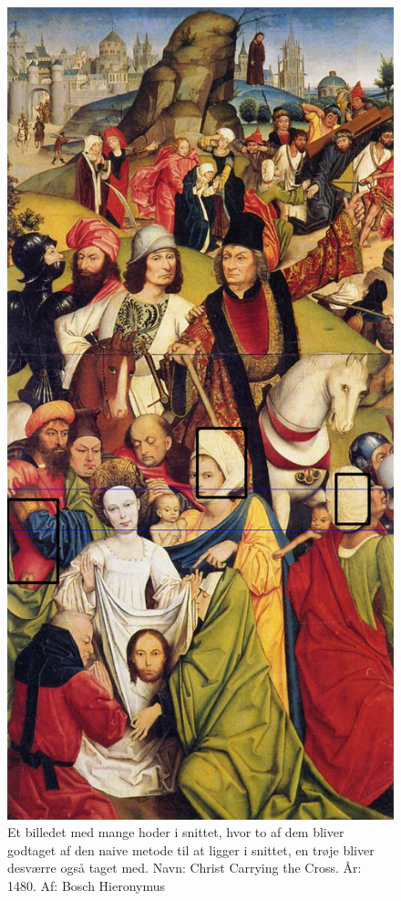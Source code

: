 \begin{figure}[h!!]
	\begin{center}
		\includegraphics[scale=0.3,angle=0]{afsnit/afprovning/billeder/naive_losning/naiv_kfarver_kdetaljer.png}
	\end{center}
	\caption[]{Et billedet med mange hoder i snittet, hvor to af dem
	bliver godtaget af den naive metode til at ligger i snittet, en
	trøje bliver desværre også taget med. Navn: Christ Carrying the
	Cross. År: 1480. Af: Bosch Hieronymus}
	\label{naiv_kfarver_kdetaljer}
\end{figure}

